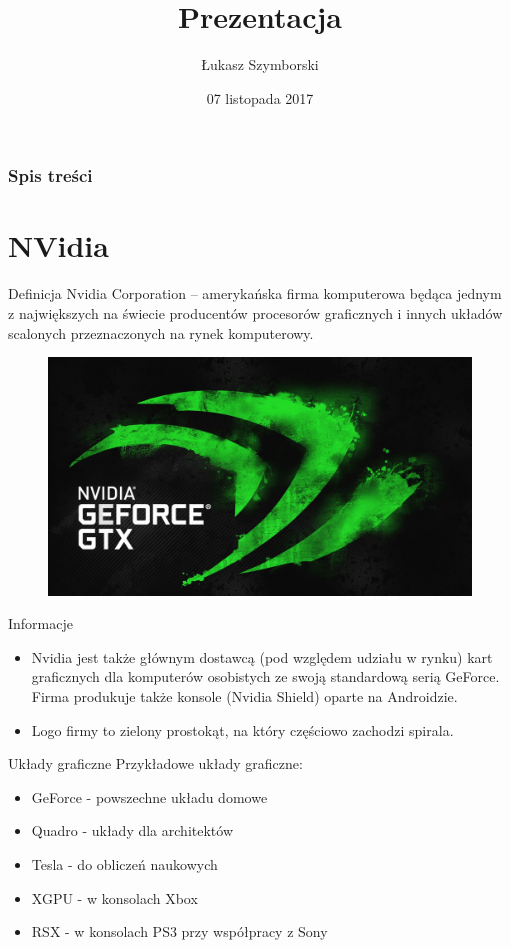 \documentclass{beamer}
\title{Prezentacja}
\author{Łukasz Szymborski}
\date{07 listopada 2017}
\begin{document}
\frame{\titlepage}
\begin{frame}
\frametitle{Spis treści}
\tableofcontents
\end{frame}
\section{NVidia}
\begin{frame}{Definicja}
Nvidia Corporation – amerykańska firma komputerowa będąca jednym z największych na świecie producentów procesorów graficznych i innych układów scalonych przeznaczonych na rynek komputerowy.
\begin{figure}
\centering
\includegraphics[scale=0.2]{nvidia.jpg}
\end{figure}
\end{frame}
\begin{frame}{Informacje}
\begin{itemize}
\item<1-2> Nvidia jest także głównym dostawcą (pod względem udziału w rynku) kart graficznych dla komputerów osobistych ze swoją standardową serią GeForce. Firma produkuje także konsole (Nvidia Shield) oparte na Androidzie.
\pause
\item<-2> Logo firmy to zielony prostokąt, na który częściowo zachodzi spirala.
\end{itemize}
\end{frame}
\begin{frame}{Układy graficzne}
Przykładowe układy graficzne:
\begin{itemize}
\item<1-5> GeForce - powszechne układu domowe
\item<2-5> Quadro - układy dla architektów
\item<3-5> Tesla - do obliczeń naukowych
\item<4-5> XGPU - w konsolach Xbox
\item<5> RSX - w konsolach PS3 przy współpracy z Sony
\end{itemize}
\end{frame}
\end{document}
